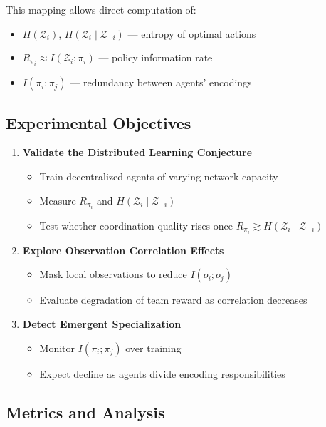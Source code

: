 \documentclass[10pt, letterpaper]{article}
\begin{document}
This mapping allows direct computation of:
\begin{itemize}
    \item $H(\mathcal{Z}_i)$, $H(\mathcal{Z}_i\mid\mathcal{Z}_{-i})$ --- entropy of optimal actions
    \item $R_{\pi_i} \approx I(\mathcal{Z}_i; \pi_i)$ --- policy information rate
    \item $I(\pi_i; \pi_j)$ --- redundancy between agents' encodings
\end{itemize}

\subsection{Experimental Objectives}

\begin{enumerate}
    \item \textbf{Validate the Distributed Learning Conjecture}
    \begin{itemize}
        \item Train decentralized agents of varying network capacity
        \item Measure $R_{\pi_i}$ and $H(\mathcal{Z}_i\mid\mathcal{Z}_{-i})$
        \item Test whether coordination quality rises once $R_{\pi_i} \gtrsim H(\mathcal{Z}_i\mid\mathcal{Z}_{-i})$
    \end{itemize}
    \item \textbf{Explore Observation Correlation Effects}
    \begin{itemize}
        \item Mask local observations to reduce $I(o_i; o_j)$
        \item Evaluate degradation of team reward as correlation decreases
    \end{itemize}
    \item \textbf{Detect Emergent Specialization}
    \begin{itemize}
        \item Monitor $I(\pi_i; \pi_j)$ over training
        \item Expect decline as agents divide encoding responsibilities
    \end{itemize}
\end{enumerate}

\subsection{Metrics and Analysis}
\end{document}
